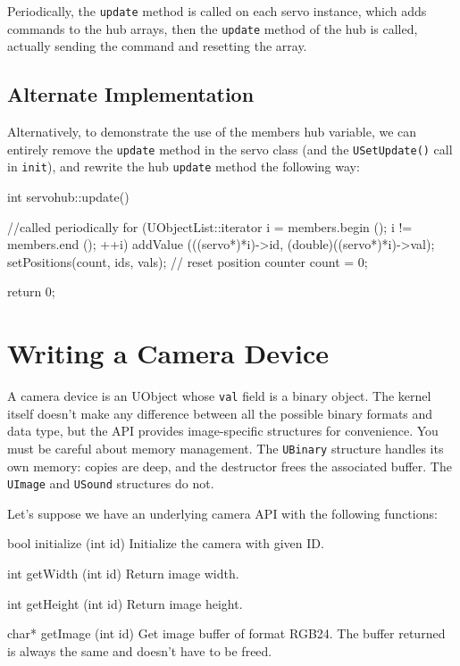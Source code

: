 Periodically, the \lstinline{update} method is called on each servo
instance, which adds commands to the hub arrays, then the
\lstinline{update} method of the hub is called, actually sending the
command and resetting the array.

\subsection{Alternate Implementation}

Alternatively, to demonstrate the use of the members hub variable, we
can entirely remove the \lstinline{update} method in the servo class
(and the \lstinline{USetUpdate()} call in \lstinline{init}), and
rewrite the hub \lstinline{update} method the following way:

\begin{cxx}
int servohub::update()
{
  //called periodically
  for (UObjectList::iterator i = members.begin ();
       i != members.end ();
       ++i)
    addValue (((servo*)*i)->id, (double)((servo*)*i)->val);
  setPositions(count, ids, vals);
  // reset position counter
  count = 0;

  return 0;
}
\end{cxx}

\section{Writing a Camera Device}

A camera device is an UObject whose \lstinline{val} field is a binary
object. The \urbi kernel itself doesn't make any difference between all the
possible binary formats and data type, but the API provides image-specific
structures for convenience. You must be careful about memory management. The
\lstinline{UBinary} structure handles its own memory: copies are deep, and
the destructor frees the associated buffer. The \lstinline{UImage} and
\lstinline{USound} structures do not.

Let's suppose we have an underlying camera API with the following functions:
\begin{cxxapi}
\item[bool initialize (int id)]
  Initialize the camera with given ID.
\item[int getWidth (int id)]
  Return image width.
\item[int getHeight (int id)]
  Return image height.
\item[char* getImage (int id)]
  Get image buffer of format RGB24.  The buffer returned is always the
  same and doesn't have to be freed.
\end{cxxapi}

